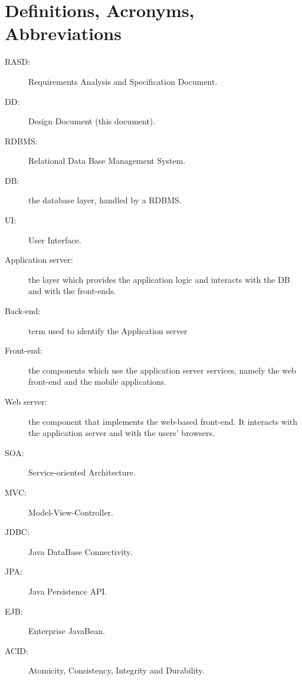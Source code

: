\section{Definitions, Acronyms, Abbreviations}
\label{sec:definitions}

\begin{description}
\item[RASD:] Requirements Analysis and Specification Document.
\item[DD:] Design Document (this document).
\item[RDBMS:] Relational Data Base Management System.
\item[DB:] the database layer, handled by a RDBMS.
\item[UI:] User Interface.
\item[Application server:] the layer which provides the application logic and interacts with the DB and with the front-ends.
\item[Back-end:] term used to identify the Application server
\item[Front-end:] the components which use the application server services, namely the web front-end and the mobile applications.
\item[Web server:] the component that implements the web-based front-end. It interacts with the application server and with the users' browsers.
\item[SOA:] Service-oriented Architecture.
\item[MVC:] Model-View-Controller.
\item[JDBC:] Java DataBase Connectivity.
\item[JPA:] Java Persistence API.
\item[EJB:] Enterprise JavaBean.
\item[ACID:] Atomicity, Consistency, Integrity and Durability.
\end{description}
